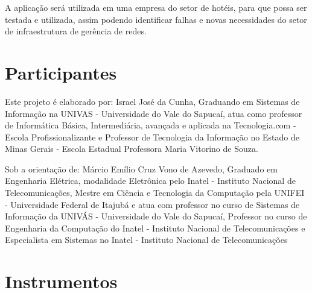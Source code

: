 
\par A aplicação será utilizada em uma empresa do setor de hotéis, para que
possa ser testada e utilizada, assim podendo identificar falhas e novas
necessidades do setor de infraestrutura de gerência de redes.



\section{Participantes}


\par Este projeto é elaborado por: Israel José da Cunha, 
Graduando em Sistemas de Informação na UNIVAS - Universidade do Vale do
Sapucaí, atua como professor de Informática Básica, Intermediária, avançada e
aplicada na Tecnologia.com - Escola Profissionalizante e 
Professor de Tecnologia da Informação no Estado de Minas Gerais - Escola
Estadual Professora Maria Vitorino de Souza.

\par Sob a orientação de: Márcio Emílio Cruz Vono de Azevedo, Graduado em
Engenharia Elétrica, modalidade Eletrônica pelo Inatel - Instituto Nacional de Telecomunicações, 
Mestre em Ciência e Tecnologia da Computação pela UNIFEI - Universidade
Federal de Itajubá e atua com professor no curso de Sistemas de Informação da
UNIVÁS - Universidade do Vale do Sapucaí, Professor no curso de Engenharia da Computação do Inatel - Instituto
Nacional de Telecomunicações e Especialista em Sistemas no Inatel - Instituto
Nacional de Telecomunicações




\section{Instrumentos}



